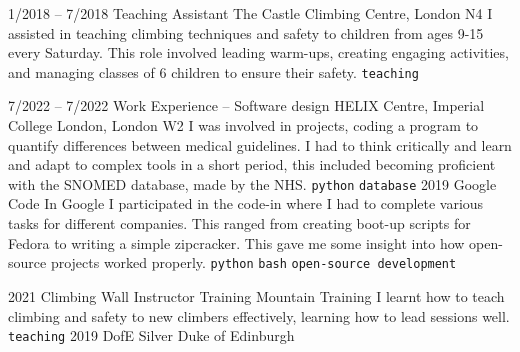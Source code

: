 \documentclass[9pt]{developercv} %
\begin{document}
\vspace{-10 pt}
\begin{entrylist}
	\entry
		{1/2018 -- 7/2018}
		{Teaching Assistant}
		{The Castle Climbing Centre, London N4}
		{
			I assisted in teaching climbing techniques and safety to children from ages 9-15 every Saturday.
			This role involved leading warm-ups, creating engaging activities, and managing classes of 6 children to ensure their safety.
			\newline
			\texttt{teaching}
		}
\end{entrylist}


\vspace{-10 pt}
\begin{entrylist}
	\entry
	{7/2022 -- 7/2022}
	{Work Experience – Software design}
	{HELIX Centre, Imperial College London, London W2}
	{
		I was involved in projects, coding a program to quantify differences between medical guidelines.
		I had to think critically and learn and adapt to complex tools in a short period, this included becoming proficient with the SNOMED database, made by the NHS. 
		\newline
		\texttt{python} \slashsep \texttt{database}
	}
	\entry
        {2019}
		{Google Code In}
		{Google}
		{
			I participated in the code-in where I had to complete various tasks for different companies. 
			This ranged from creating boot-up scripts for Fedora to writing a simple zipcracker. 
			This gave me some insight into how open-source projects worked properly. 
        	\newline
			\texttt{python} \slashsep \texttt{bash} \slashsep \texttt{open-source development}
		}
\end{entrylist}


\vspace{-10 pt}
\begin{entrylist}
	\entry
        {2021}
		{Climbing Wall Instructor Training}
		{Mountain Training}
		{ 
			I learnt how to teach climbing and safety to new climbers effectively, learning how to lead sessions well. 
			\newline
        	\texttt{teaching}
		}
	\entry
        {2019}
		{DofE Silver}
		{Duke of Edinburgh}
		{ 
		}
\end{entrylist}
\end{document}
